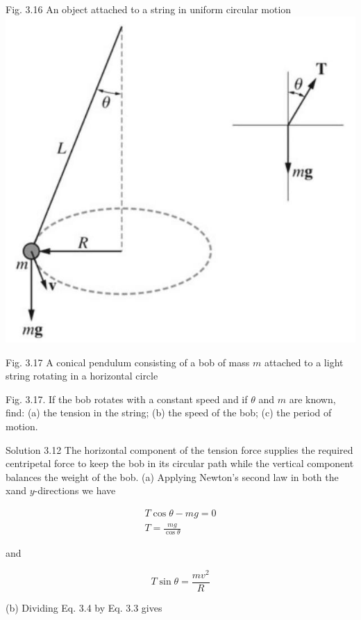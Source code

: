 \documentclass[10pt]{article}
\begin{document}
Fig. 3.16 An object attached to a string in uniform circular motion\\
\includegraphics[max width=\textwidth, center]{2024_09_13_db1f357d2aad0a03eb2eg-057}

Fig. 3.17 A conical pendulum consisting of a bob of mass $m$ attached to a light string rotating in a horizontal circle

Fig. 3.17. If the bob rotates with a constant speed and if $\theta$ and $m$ are known, find: (a) the tension in the string; (b) the speed of the bob; (c) the period of motion.

Solution 3.12 The horizontal component of the tension force supplies the required centripetal force to keep the bob in its circular path while the vertical component balances the weight of the bob. (a) Applying Newton's second law in both the xand $y$-directions we have


\begin{gather*}
T \cos \theta-m g=0 \\
T=\frac{m g}{\cos \theta} \tag{3.3}
\end{gather*}


and


\begin{equation*}
T \sin \theta=\frac{m v^{2}}{R} \tag{3.4}
\end{equation*}


(b) Dividing Eq. 3.4 by Eq. 3.3 gives
\end{document}
